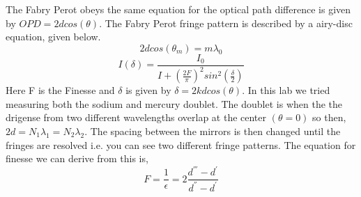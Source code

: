 \documentclass[paper=a4, fontsize=11pt]{scrartcl} %
\numberwithin{equation}{section} %
\numberwithin{figure}{section} %
\numberwithin{table}{section} %
\begin{document}
The Fabry Perot obeys the same equation for the optical path difference is given by $ OPD = 2dcos(\theta)$. The Fabry Perot fringe pattern is described by a airy-disc equation, given below.
\begin{equation}
2dcos(\theta_m) = m\lambda_0 
\end{equation}
\begin{equation}
I(\delta) = \frac{I_0}{I+(\frac{2F}{\pi})^2 sin^2(\frac{\delta}{2})}
\end{equation}
Here F is the Finesse and $\delta$ is given by $\delta = 2kdcos(\theta)$. In this lab we tried measuring both the sodium and mercury doublet. The doublet is when the the drigense from two different wavelengths overlap at the center $(\theta = 0)$ so then, $2d = N_1\lambda_1 = N_2 \lambda_2$. The spacing between the mirrors is then changed until the fringes are resolved i.e. you can see two different fringe patterns. The equation for finesse we can derive from this is,
\begin{equation}
F = \frac{1}{\epsilon} = 2\frac{ d^{'''} -d^{'}}{d^{''} -d^{'}}
\end{equation}
\end{document}
